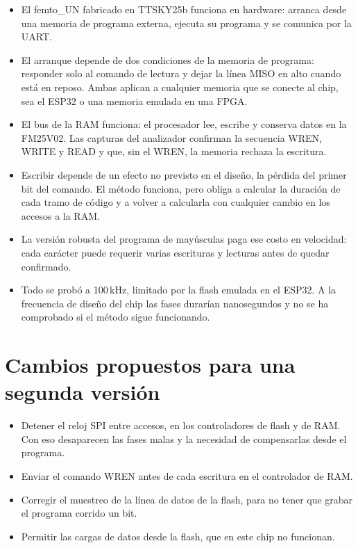 \documentclass[11pt,letterpaper,oneside]{report}
\begin{document}
\begin{itemize}
  \item El femto\_UN fabricado en TTSKY25b funciona en hardware: arranca desde una memoria de programa externa, ejecuta su programa y se comunica por la UART.
  \item El arranque depende de dos condiciones de la memoria de programa: responder solo al comando de lectura y dejar la línea MISO en alto cuando está en reposo. Ambas aplican a cualquier memoria que se conecte al chip, sea el ESP32 o una memoria emulada en una FPGA.
  \item El bus de la RAM funciona: el procesador lee, escribe y conserva datos en la FM25V02. Las capturas del analizador confirman la secuencia WREN, WRITE y READ y que, sin el WREN, la memoria rechaza la escritura.
  \item Escribir depende de un efecto no previsto en el diseño, la pérdida del primer bit del comando. El método funciona, pero obliga a calcular la duración de cada tramo de código y a volver a calcularla con cualquier cambio en los accesos a la RAM.
  \item La versión robusta del programa de mayúsculas paga ese costo en velocidad: cada carácter puede requerir varias escrituras y lecturas antes de quedar confirmado.
  \item Todo se probó a 100\,kHz, limitado por la flash emulada en el ESP32. A la frecuencia de diseño del chip las fases durarían nanosegundos y no se ha comprobado si el método sigue funcionando.
\end{itemize}

\section{Cambios propuestos para una segunda versión}

\begin{itemize}
  \item Detener el reloj SPI entre accesos, en los controladores de flash y de RAM. Con eso desaparecen las fases malas y la necesidad de compensarlas desde el programa.
  \item Enviar el comando WREN antes de cada escritura en el controlador de RAM.
  \item Corregir el muestreo de la línea de datos de la flash, para no tener que grabar el programa corrido un bit.
  \item Permitir las cargas de datos desde la flash, que en este chip no funcionan.
\end{itemize}
\end{document}

